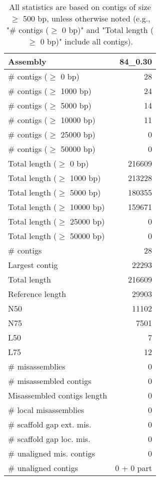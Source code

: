 \documentclass[12pt,a4paper]{article}
\begin{document}
\begin{table}[ht]
\begin{center}
\caption{All statistics are based on contigs of size $\geq$ 500 bp, unless otherwise noted (e.g., "\# contigs ($\geq$ 0 bp)" and "Total length ($\geq$ 0 bp)" include all contigs).}
\begin{tabular}{|l*{1}{|r}|}
\hline
Assembly & 84\_0.30 \\ \hline
\# contigs ($\geq$ 0 bp) & 28 \\ \hline
\# contigs ($\geq$ 1000 bp) & 24 \\ \hline
\# contigs ($\geq$ 5000 bp) & 14 \\ \hline
\# contigs ($\geq$ 10000 bp) & 11 \\ \hline
\# contigs ($\geq$ 25000 bp) & 0 \\ \hline
\# contigs ($\geq$ 50000 bp) & 0 \\ \hline
Total length ($\geq$ 0 bp) & 216609 \\ \hline
Total length ($\geq$ 1000 bp) & 213228 \\ \hline
Total length ($\geq$ 5000 bp) & 180355 \\ \hline
Total length ($\geq$ 10000 bp) & 159671 \\ \hline
Total length ($\geq$ 25000 bp) & 0 \\ \hline
Total length ($\geq$ 50000 bp) & 0 \\ \hline
\# contigs & 28 \\ \hline
Largest contig & 22293 \\ \hline
Total length & 216609 \\ \hline
Reference length & 29903 \\ \hline
N50 & 11102 \\ \hline
N75 & 7501 \\ \hline
L50 & 7 \\ \hline
L75 & 12 \\ \hline
\# misassemblies & 0 \\ \hline
\# misassembled contigs & 0 \\ \hline
Misassembled contigs length & 0 \\ \hline
\# local misassemblies & 0 \\ \hline
\# scaffold gap ext. mis. & 0 \\ \hline
\# scaffold gap loc. mis. & 0 \\ \hline
\# unaligned mis. contigs & 0 \\ \hline
\# unaligned contigs & 0 + 0 part \\ \hline

\end{tabular}
\end{center}
\end{table}
\end{document}
